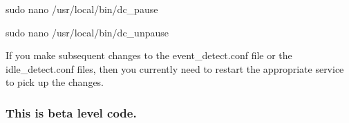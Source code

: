 \begin{DoxyItemize}
\item sudo nano /usr/local/bin/dc\+\_\+pause
\item sudo nano /usr/local/bin/dc\+\_\+unpause
\end{DoxyItemize}
\begin{DoxyEnumerate}
\item If you make subsequent changes to the event\+\_\+detect.\+conf file or the idle\+\_\+detect.\+conf files, then you currently need to restart the appropriate service to pick up the changes.
\end{DoxyEnumerate}

\subsubsection*{This is beta level code.}